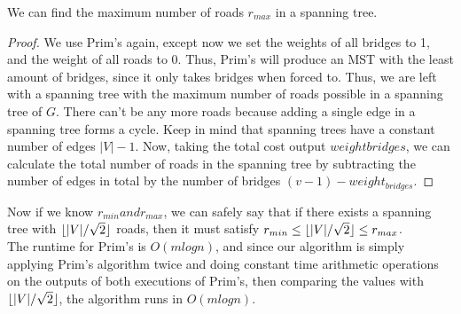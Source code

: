 \documentclass[11pt]{article}
\DeclarePairedDelimiter\floor{\lfloor}{\rfloor}
\begin{document}
\begin{claim*} We can find the maximum number of roads $r_{max}$ in a spanning tree. \end{claim*}
\begin{proof} We use Prim's again, except now we set the weights of all bridges to 1, and the weight of all roads to 0. Thus, Prim's will produce an MST with the least amount of bridges, since it only takes bridges when forced to. Thus, we are left with a spanning tree with the maximum number of roads possible in a spanning tree of $G$. There can't be any more roads because adding a single edge in a spanning tree forms a cycle. Keep in mind that spanning trees have a constant number of edges $|V|-1$. Now, taking the total cost output $weight{bridges}$, we can calculate the total number of roads in the spanning tree by subtracting the number of edges in total by the number of bridges $(v-1) - weight_{bridges}$.\end{proof}

Now if we know $r_{min} and r_{max}$, we can safely say that if there exists a spanning tree with $\floor{|V|/\sqrt{2}}$ roads, then it must satisfy $r_{min} \leq \floor{|V|/\sqrt{2}} \leq r_{max}$.\\

The runtime for Prim's is $O(mlogn)$, and since our algorithm is simply applying Prim's algorithm twice and doing constant time arithmetic operations on the outputs of both executions of Prim's, then comparing the values with $\floor{|V|/\sqrt{2}}$, the algorithm runs in $O(mlogn)$.
\end{document}
